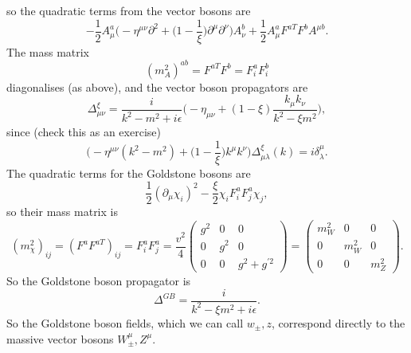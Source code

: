 \documentclass[a4paper,12pt]{article}
\begin{document}
so the quadratic terms from the vector bosons are
\begin{equation}
-\frac{1}{2}A_\mu^a \bigg(-\eta^{\mu \nu}\partial^2 + \bigg(1-\frac{1}{\xi}\bigg)\partial^\mu \partial^\nu\bigg)A_\nu^b + \frac{1}{2}A_\mu^a F^{a T}F^b A^{\mu b}.
\end{equation}
The mass matrix 
\begin{equation}
(m_A^2)^{ab} = F^{a T}F^b = F_i^aF_i^b
\end{equation}
diagonalises (as above), and the vector boson propagators are
\begin{equation}
\Delta_{\mu \nu }^\xi = \frac{i}{k^2 - m^2 + i\epsilon} \bigg(-\eta_{\mu \nu} + (1-\xi) \frac{k_\mu k_\nu}{k^2 -\xi m^2} \bigg),
\end{equation}
since (check this as an exercise)
\begin{equation}
\bigg( -\eta^{\mu \nu}(k^2 - m^2) + \bigg( 1 - \frac{1}{\xi}\bigg)k^\mu k^\nu \bigg) \Delta_{\mu \lambda}^\xi(k) = i \delta_\lambda^\mu.
\end{equation}
The quadratic terms for the Goldstone bosons are
\begin{equation}
\frac{1}{2}(\partial_\mu \chi_i)^2 - \frac{\xi}{2} \chi_i F_i^a F_j^a \chi_j,
\end{equation}
so their mass matrix is
\begin{equation}
(m_\chi^2)_{ij} = (F^a F^{a T})_{ij} = F^a_i F^a_j = \frac{v^2}{4}
\begin{pmatrix}
g^2 & 0 & 0 \\
0 & g^2 & 0 \\
0 & 0 & g^2 + g^{\prime 2} 
\end{pmatrix}
= \begin{pmatrix}
m_W^2 & 0 & 0 \\
0 & m_W^2 & 0 \\
0 & 0 & m_Z^2
\end{pmatrix}.
\end{equation}
So the Goldstone boson propagator is
\begin{equation}
\Delta^{GB} = \frac{i}{k^2 - \xi m^2 + i\epsilon}.
\end{equation}
So the Goldstone boson fields, which we can call $w_{\pm}, z$, correspond directly to the massive vector bosons $W^\mu_{\pm}, Z^\mu$.
\end{document}
